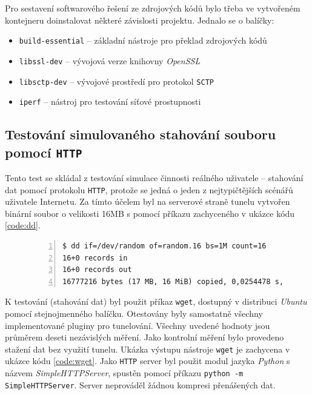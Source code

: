 \documentclass[thesis=M,czech]{FITthesis}[2012/10/20]
\begin{document}
Pro sestavení softwarového řešení ze zdrojových kódů bylo třeba ve vytvořeném kontejneru doinstalovat některé závislosti projektu. Jednalo se o balíčky:
\begin{itemize}
 \item \texttt{build-essential} -- základní nástroje pro překlad zdrojových kódů
 \item \texttt{libssl-dev} -- vývojová verze knihovny \textit{OpenSSL}
 \item \texttt{libsctp-dev} -- vývojové prostředí pro protokol \texttt{SCTP}
 \item \texttt{iperf} -- nástroj pro testování síťové prostupnosti
\end{itemize}


\subsection{Testování simulovaného stahování souboru pomocí \texttt{HTTP}}
\label{test:http}

Tento test se skládal z testování simulace činnosti reálného uživatele -- stahování dat pomocí protokolu \texttt{HTTP}, protože se jedná o jeden z nejtypičtějších scénářů uživatele Internetu. Za tímto účelem byl na serverové straně tunelu vytvořen binární soubor o velikosti 16MB s pomocí příkazu zachyceného v ukázce kódu \ref{code:dd}.


    \begin{figure}[h]
	\begin{lstlisting}[label=code:dd,caption=Vytvoření souboru binárních dat za účelem testování přenosu pomocí \texttt{HTTP},frame=single,numbers=left]
$ dd if=/dev/random of=random.16 bs=1M count=16
16+0 records in
16+0 records out
16777216 bytes (17 MB, 16 MiB) copied, 0,0254478 s, 659 MB/s
      \end{lstlisting}
    \end{figure}

    K testování (stahování dat) byl použit příkaz \texttt{wget}, dostupný v distribuci \textit{Ubuntu} pomocí stejnojmenného balíčku. Otestovány byly samostatně všechny implementované pluginy pro tunelování. Všechny uvedené hodnoty jsou průměrem deseti nezávislých měření. Jako kontrolní měření bylo provedeno stažení dat bez využití tunelu. Ukázka výstupu nástroje \texttt{wget} je zachycena v ukázce kódu \ref{code:wget}. Jako \texttt{HTTP} server byl použit modul jazyka \textit{Python} s názvem \textit{SimpleHTTPServer}, spustěn pomocí příkazu \texttt{python -m SimpleHTTPServer}. Server neprováděl žádnou kompresi přenášených dat.
    
\end{document}
